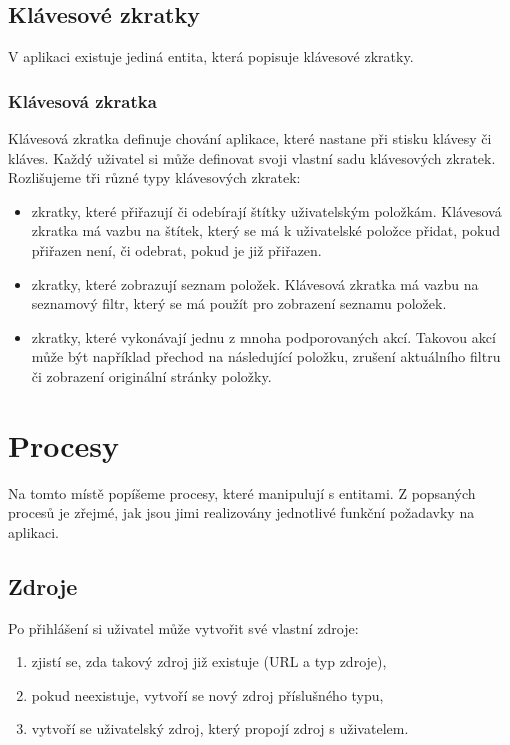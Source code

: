 \subsection{Klávesové zkratky}

V aplikaci existuje jediná entita, která popisuje klávesové zkratky.

\subsubsection{Klávesová zkratka}

Klávesová zkratka definuje chování aplikace, které nastane při stisku klávesy či kláves.
Každý uživatel si může definovat svoji vlastní sadu klávesových zkratek.
Rozlišujeme tři různé typy klávesových zkratek:
\begin{itemize}
	\item zkratky, které přiřazují či odebírají štítky uživatelským položkám.
		Klávesová zkratka má vazbu na štítek, který se má k uživatelské položce přidat, pokud přiřazen není, či odebrat, pokud je již přiřazen.
	\item zkratky, které zobrazují seznam položek.
		Klávesová zkratka má vazbu na seznamový filtr, který se má použít pro zobrazení seznamu položek.
	\item zkratky, které vykonávají jednu z mnoha podporovaných akcí.
		Takovou akcí může být například přechod na následující položku, zrušení aktuálního filtru či zobrazení originální stránky položky.
\end{itemize}

\section{Procesy}

Na tomto místě popíšeme procesy, které manipulují s entitami.
Z popsaných procesů je zřejmé, jak jsou jimi realizovány jednotlivé funkční požadavky na aplikaci.

\subsection{Zdroje}

Po přihlášení si uživatel může vytvořit své vlastní zdroje:
\begin{enumerate}
	\item zjistí se, zda takový zdroj již existuje (URL a typ zdroje),
	\item pokud neexistuje, vytvoří se nový zdroj příslušného typu,
	\item vytvoří se uživatelský zdroj, který propojí zdroj s uživatelem.
\end{enumerate}

